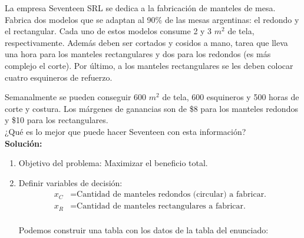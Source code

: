 \documentclass[../main.tex]{subfiles}
\begin{document}
        \begin{exercise}
            La empresa Seventeen SRL se dedica a la fabricación de manteles de mesa. Fabrica dos modelos que se adaptan al 90\% de las mesas argentinas: el redondo y el rectangular. Cada uno de estos modelos consume 2 y 3 $m^2$ de tela, respectivamente. Además deben ser cortados y cosidos a mano, tarea que lleva una hora para los manteles rectangulares y dos para los redondos (es más complejo el corte). Por último, a los manteles rectangulares se les deben colocar cuatro esquineros de refuerzo.
            
            Semanalmente se pueden conseguir 600 $m^2$ de tela, 600 esquineros y 500 horas de corte y costura. Los márgenes de ganancias son de \$8 para los manteles redondos y \$10 para los rectangulares.\\

            ¿Qué es lo mejor que puede hacer Seventeen con esta información?\\

            \textbf{Solución:}
            \begin{enumerate}
                \item Objetivo del problema: Maximizar el beneficio total.
                \item Definir variables de decisión:
                    \begin{equation}
                        \begin{split}
                            x_C &= \text{Cantidad de manteles redondos (circular) a fabricar.} \\
                            x_R &= \text{Cantidad de manteles rectangulares a fabricar.} \\
                        \end{split}
                    \end{equation}

                    Podemos construir una tabla con los datos de la tabla del enunciado:


\end{enumerate}
\end{exercise}
\end{document}
